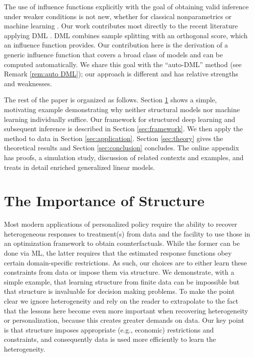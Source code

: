 \documentclass[12pt]{article}
\numberwithin{equation}{section}
\theoremstyle{definition}
\begin{document}
The use of influence functions explicitly with the goal of obtaining valid inference under weaker conditions is not new, whether for classical nonparametrics \cite{Cattaneo2010_JoE} or machine learning \cite{Farrell2015_arXiv}. Our work contributes most directly to the recent literature applying DML \cite{Chernozhukov-etal2018_EJ}. DML combines sample splitting with an orthogonal score, which an influence function provides. Our contribution here is the derivation of a generic influence function that covers a broad class of models and can be computed automatically. We share this goal with the ``auto-DML'' method (see Remark \ref{rem:auto DML}); our approach is different and has relative strengths and weaknesses.




The rest of the paper is organized as follows. Section \ref{sec:structure} shows a simple, motivating example demonstrating why neither structural models nor machine learning individually suffice. Our framework for structured deep learning and subsequent inference is described in Section \ref{sec:framework}. We then apply the method to data in Section \ref{sec:application}. Section \ref{sec:theory} gives the theoretical results and Section \ref{sec:conclusion} concludes. The online appendix has proofs, a simulation study, discussion of related contexts and examples, and treats in detail enriched generalized linear models. 







\section{The Importance of Structure}
	\label{sec:structure}

Most modern applications of personalized policy require the ability to recover heterogeneous responses to treatment(s) from data and the facility to use those in an optimization framework to obtain counterfactuals. While the former can be done via ML, the latter requires that the estimated response functions obey certain domain-specific restrictions. As such, our choices are to either learn these constraints from data or impose them via structure. We demonstrate, with a simple example, that learning structure from finite data can be impossible but that structure is invaluable for decision making problems. To make the point clear we ignore heterogeneity and rely on the reader to extrapolate to the fact that the lessons here become even more important when recovering heterogeneity or personalization, because this creates greater demands on data. Our key point is that structure imposes appropriate (e.g., economic) restrictions and constraints, and consequently data is used more efficiently to learn the heterogeneity. 
\end{document}
